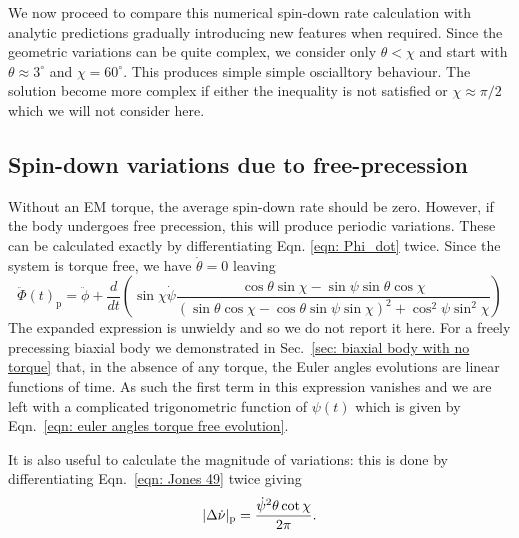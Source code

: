 \documentclass[../full_thesis/full_thesis.tex]{subfiles}
\begin{document}
We now proceed to compare this numerical spin-down rate calculation with analytic
predictions gradually introducing new features when required. Since the geometric
variations can be quite complex, we consider only $\theta < \chi$ and start
with $\theta \approx 3^{\circ}$ and $\chi=60^{\circ}$. This produces simple
simple oscialltory behaviour. The solution become more complex if either
the inequality is not satisfied or $\chi \approx \pi/2$ which we will not
consider here.

\subsection{Spin-down variations due to free-precession}
\label{sec: spin-down free precession}

Without an EM torque, the average spin-down rate should be zero. However, if
the body undergoes free precession, this will produce periodic variations.
These can be calculated exactly by differentiating Eqn. \eqref{eqn: Phi_dot}
twice. Since the system is torque free, we have $\dot{\theta} = 0$ leaving
\begin{equation}
    \ddot{\Phi}(t)_{\mathrm{p}} = \ddot{\phi} + \frac{d}{dt}\left(
        \sin\chi\dot{\psi} \frac{\cos\theta\sin\chi - \sin \psi \sin \theta \cos\chi
}{(\sin\theta \cos \chi - \cos \theta \sin \psi \sin \chi)^{2} + \cos^{2}\psi \sin^{2} \chi}
\right)
\label{eqn: Phi_ddot FP}
\end{equation}
The expanded expression is unwieldy and so we do not report it here. For a
freely precessing biaxial body we demonstrated in Sec.~\ref{sec: biaxial body
with no torque} that, in the absence of any torque, the Euler angles evolutions
are linear functions of time. As such the first term in this expression
vanishes and we are left with a complicated trigonometric function of $\psi(t)$
which is given by Eqn.~\eqref{eqn: euler angles torque free evolution}.

It is also useful to calculate the magnitude of variations: this is done by
differentiating Eqn.~\eqref{eqn: Jones 49} twice giving
\begin{equation}
    |\Delta\dot{\nu}|_{\mathrm{p}} =\frac{\dot{\psi}^{2} \theta \cot\chi}{2\pi}.
    \label{eqn: spin-down variations FP}
\end{equation}
\end{document}
